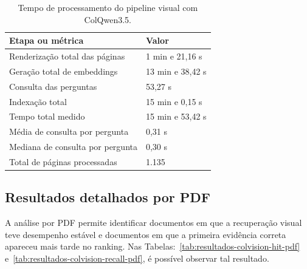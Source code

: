 \begin{table}[htbp]
\centering
\caption{Tempo de processamento do pipeline visual com ColQwen3.5.}
\label{tab:tempo-colvision}
\small
\begin{tabular}{p{7.6cm}p{4.8cm}}
\toprule
\textbf{Etapa ou métrica} & \textbf{Valor} \\
\midrule
Renderização total das páginas & 1 min e 21,16 s \\
Geração total de embeddings & 13 min e 38,42 s \\
Consulta das perguntas & 53,27 s \\
\addlinespace
Indexação total & 15 min e 0,15 s \\
Tempo total medido & 15 min e 53,42 s \\
\addlinespace
Média de consulta por pergunta & 0,31 s \\
Mediana de consulta por pergunta & 0,30 s \\
Total de páginas processadas & 1.135 \\
\bottomrule
\end{tabular}
\end{table}

\subsection{Resultados detalhados por PDF}
\label{subsec:colvision-resultados-pdf}

A análise por PDF permite identificar documentos em que a recuperação visual teve desempenho estável e documentos em que a primeira evidência correta apareceu mais tarde no ranking. Nas Tabelas:~\ref{tab:resultados-colvision-hit-pdf} e~\ref{tab:resultados-colvision-recall-pdf}, é possível observar tal resultado.

